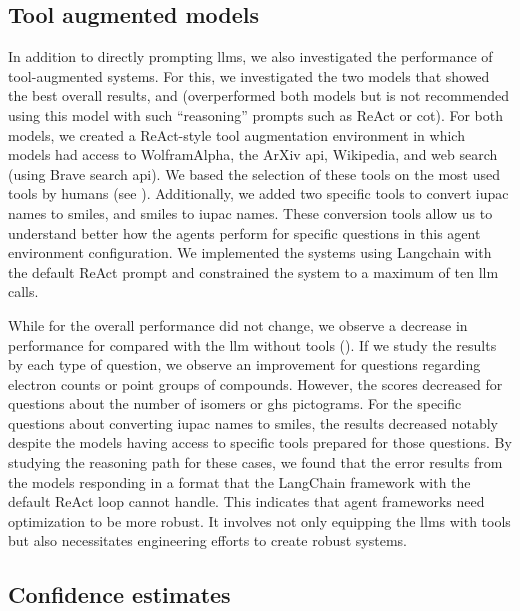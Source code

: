 \subsection{Tool augmented models} \label{sec:react-environment}
In addition to directly prompting \glspl{llm}, we also investigated the performance of tool-augmented systems.
For this, we investigated the two models that showed the best overall results, \GPTFourO and \ClaudeThreeFiveSonnet (\oone overperformed both models but is not recommended using this model with such \enquote{reasoning} prompts such as ReAct\autocite{yao2022react} or \gls{cot}\autocite{wei2023cot}).
For both models, we created a ReAct-style tool augmentation environment in which models had access to WolframAlpha, the ArXiv \gls{api}, Wikipedia, and web search (using Brave search \gls{api}).
We based the selection of these tools on the most used tools by humans (see ).
Additionally, we added two specific tools to convert \gls{iupac} names to \gls{smiles}, and \gls{smiles} to \gls{iupac} names.
These conversion tools allow us to understand better how the agents perform for specific questions in this agent environment configuration.
We implemented the systems using Langchain\autocite{Chase_LangChain_2022} with the default ReAct prompt and constrained the system to a maximum of ten \gls{llm} calls.

While for \ClaudeThreeFiveSonnet the overall performance did not change, we observe a decrease in performance for \GPTFourO compared with the \gls{llm} without tools ().
If we study the results by each type of question, we observe an improvement for questions regarding electron counts or point groups of compounds.
However, the scores decreased for questions about the number of isomers or \gls{ghs} pictograms.
For the specific questions about converting \gls{iupac} names to \gls{smiles}, the results decreased notably despite the models having access to specific tools prepared for those questions.
By studying the reasoning path for these cases, we found that the error results from the models responding in a format that the LangChain framework with the default ReAct loop cannot handle.
This indicates that agent frameworks need optimization to be more robust. It involves not only equipping the \glspl{llm} with tools but also necessitates engineering efforts to create robust systems.


\clearpage
\subsection{Confidence estimates} \label{sec:confidence_estimates}


